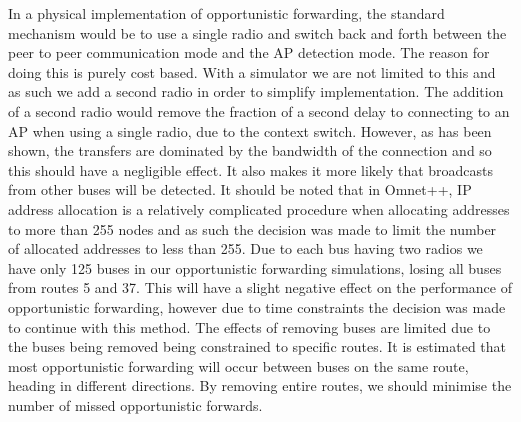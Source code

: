         In a physical implementation of opportunistic forwarding, the standard mechanism would be to use a single radio and switch back and forth between the peer to peer communication mode and the AP detection mode. The reason for doing this is purely cost based. With a simulator we are not limited to this and as such we add a second radio in order to simplify implementation. The addition of a second radio would remove the fraction of a second delay to connecting to an AP when using a single radio, due to the context switch. However, as has been shown, the transfers are dominated by the bandwidth of the connection and so this should have a negligible effect. It also makes it more likely that broadcasts from other buses will be detected. It should be noted that in Omnet++, IP address allocation is a relatively complicated procedure when allocating addresses to more than 255 nodes and as such the decision was made to limit the number of allocated addresses to less than 255. Due to each bus having two radios we have only 125 buses in our opportunistic forwarding simulations, losing all buses from routes 5 and 37. This will have a slight negative effect on the performance of opportunistic forwarding, however due to time constraints the decision was made to continue with this method. The effects of removing buses are limited due to the buses being removed being constrained to specific routes. It is estimated that most opportunistic forwarding will occur between buses on the same route, heading in different directions. By removing entire routes, we should minimise the number of missed opportunistic forwards.

